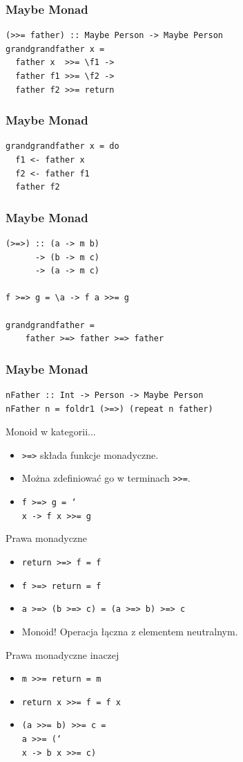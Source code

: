 \documentclass[14pt]{beamer}
\begin{document}
\begin{frame}[fragile]
\frametitle{Maybe Monad}
\begin{verbatim}
(>>= father) :: Maybe Person -> Maybe Person
grandgrandfather x =
  father x  >>= \f1 ->
  father f1 >>= \f2 ->
  father f2 >>= return
\end{verbatim}
\end{frame}

\begin{frame}[fragile]
\frametitle{Maybe Monad}
\begin{verbatim}
grandgrandfather x = do
  f1 <- father x
  f2 <- father f1
  father f2
\end{verbatim}
\end{frame}

\begin{frame}[fragile]
\frametitle{Maybe Monad}
\begin{verbatim}
(>=>) :: (a -> m b)
      -> (b -> m c)
      -> (a -> m c)

f >=> g = \a -> f a >>= g

grandgrandfather =
    father >=> father >=> father
\end{verbatim}
\end{frame}

\begin{frame}[fragile]
\frametitle{Maybe Monad}
\begin{verbatim}
nFather :: Int -> Person -> Maybe Person
nFather n = foldr1 (>=>) (repeat n father)
\end{verbatim}
\end{frame}

\begin{frame}{Monoid w kategorii...}
    \begin{itemize}
        \item \texttt{>=>} składa funkcje monadyczne.
        \item Można zdefiniować go w terminach \texttt{>>=}.
        \item \texttt{f >=> g = \char`\\x -> f x >>= g}
    \end{itemize}
\end{frame}

\begin{frame}{Prawa monadyczne}
    \begin{itemize}
        \item \texttt{return >=> f = f}
        \item \texttt{f >=> return = f}
        \item \texttt{a >=> (b >=> c) = (a >=> b) >=> c}
        \pause
        \item Monoid! Operacja łączna z elementem neutralnym.
    \end{itemize}
\end{frame}

\begin{frame}{Prawa monadyczne inaczej}
    \begin{itemize}
        \item \texttt{m >>= return = m}
        \item \texttt{return x >>= f = f x}
        \item \texttt{(a >>= b) >>= c =\\
            a >>= (\char`\\x -> b x >>= c)}
    \end{itemize}
\end{frame}
\end{document}
